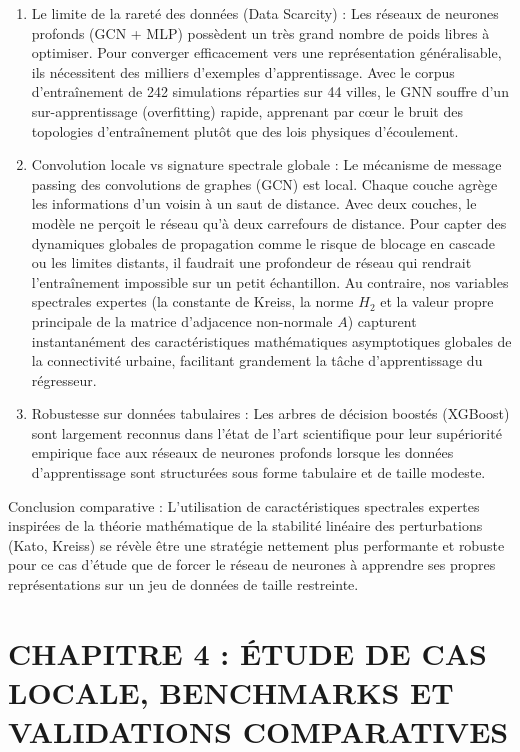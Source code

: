 \documentclass[10pt, a4paper]{article}
\providecommand{\tightlist}{}
\begin{document}
\begin{enumerate}
\def\labelenumi{\arabic{enumi}.}
\tightlist
\item
  Le limite de la rareté des données (Data Scarcity) : Les réseaux de
  neurones profonds (GCN + MLP) possèdent un très grand nombre de poids
  libres à optimiser. Pour converger efficacement vers une
  représentation généralisable, ils nécessitent des milliers d'exemples
  d'apprentissage. Avec le corpus d'entraînement de 242 simulations
  réparties sur 44 villes, le GNN souffre d'un sur-apprentissage
  (overfitting) rapide, apprenant par cœur le bruit des topologies
  d'entraînement plutôt que des lois physiques d'écoulement.
\item
  Convolution locale vs signature spectrale globale : Le mécanisme de
  message passing des convolutions de graphes (GCN) est local. Chaque
  couche agrège les informations d'un voisin à un saut de distance. Avec
  deux couches, le modèle ne perçoit le réseau qu'à deux carrefours de
  distance. Pour capter des dynamiques globales de propagation comme le
  risque de blocage en cascade ou les limites distants, il faudrait une
  profondeur de réseau qui rendrait l'entraînement impossible sur un
  petit échantillon. Au contraire, nos variables spectrales expertes (la
  constante de Kreiss, la norme \(H_2\) et la valeur propre principale
  de la matrice d'adjacence non-normale \(A\)) capturent instantanément
  des caractéristiques mathématiques asymptotiques globales de la
  connectivité urbaine, facilitant grandement la tâche d'apprentissage
  du régresseur.
\item
  Robustesse sur données tabulaires : Les arbres de décision boostés
  (XGBoost) sont largement reconnus dans l'état de l'art scientifique
  pour leur supériorité empirique face aux réseaux de neurones profonds
  lorsque les données d'apprentissage sont structurées sous forme
  tabulaire et de taille modeste.
\end{enumerate}

Conclusion comparative : L'utilisation de caractéristiques spectrales
expertes inspirées de la théorie mathématique de la stabilité linéaire
des perturbations (Kato, Kreiss) se révèle être une stratégie nettement
plus performante et robuste pour ce cas d'étude que de forcer le réseau
de neurones à apprendre ses propres représentations sur un jeu de
données de taille restreinte.

\newpage

\section{CHAPITRE 4 : ÉTUDE DE CAS LOCALE, BENCHMARKS ET VALIDATIONS
COMPARATIVES}\label{chapitre-4-uxe9tude-de-cas-locale-benchmarks-et-validations-comparatives}
\end{document}
